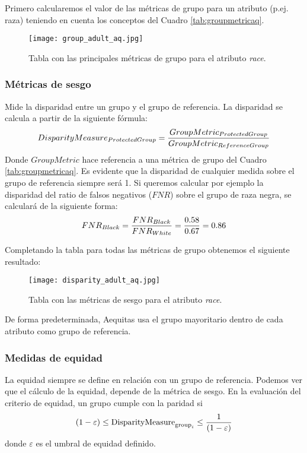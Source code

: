 Primero calcularemos el valor de las métricas de grupo para un atributo (p.ej. raza) teniendo en cuenta los conceptos del Cuadro \ref{tab:groupmetricaq}.

\begin{figure}[h]
	\centering
	\texttt{[image: group\_adult\_aq.jpg]}
	\caption{Tabla con las principales métricas de grupo para el atributo \textit{race}.}
    \label{fig:ejaq1}
\end{figure}

\subsubsection{Métricas de sesgo}

Mide la disparidad entre un grupo y el grupo de referencia. La disparidad se calcula a partir de la siguiente fórmula: $$DisparityMeasure_{ProtectedGroup}=\frac{\displaystyle GroupMetric_{ProtectedGroup}}{\displaystyle GroupMetric_{ReferenceGroup}}$$ Donde $GroupMetric$ hace referencia a una métrica de grupo del Cuadro \ref{tab:groupmetricaq}. Es evidente que la disparidad de cualquier medida sobre el grupo de referencia siempre será 1. Si queremos calcular por ejemplo la disparidad del ratio de falsos negativos ($FNR$) sobre el grupo de raza negra, se calculará de la siguiente forma: $$FNR_{Black}=\frac{\displaystyle FNR_{Black}}{\displaystyle FNR_{White}}=\frac{\displaystyle 0.58}{\displaystyle 0.67}=0.86$$

Completando la tabla para todas las métricas de grupo obtenemos el siguiente resultado:

\begin{figure}[h]
	\centering
	\texttt{[image: disparity\_adult\_aq.jpg]}
	\caption{Tabla con las métricas de sesgo para el atributo \textit{race}.}
    \label{fig:ejaq2}
\end{figure}

\begin{remark}
De forma predeterminada, Aequitas usa el grupo mayoritario dentro de cada atributo como grupo de referencia.
\end{remark}

\subsubsection{Medidas de equidad}

La equidad siempre se define en relación con un grupo de referencia. Podemos ver que el cálculo de la equidad, depende de la métrica de sesgo. En la evaluación del criterio de equidad, un grupo cumple con la paridad si $$(1-\varepsilon)\leq \text{DisparityMeasure}_{\text{group}_i} \leq \frac{\displaystyle 1}{\displaystyle (1-\varepsilon)}$$ donde $\varepsilon$ es el umbral de equidad definido.

